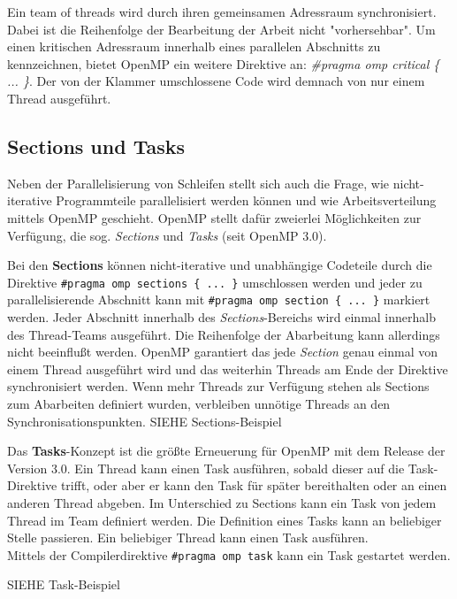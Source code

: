 \documentclass[11pt]{scrartcl}
\begin{document}
Ein team of threads wird durch ihren gemeinsamen Adressraum synchronisiert. Dabei ist die Reihenfolge der Bearbeitung der Arbeit nicht "vorhersehbar". Um einen kritischen Adressraum innerhalb eines parallelen Abschnitts zu kennzeichnen, bietet OpenMP ein weitere Direktive an: \textit{\#pragma omp critical \{ ... \}}. Der von der Klammer umschlossene Code wird demnach von nur einem Thread ausgeführt. 

\subsection{Sections und Tasks}

Neben der Parallelisierung von Schleifen stellt sich auch die Frage, wie nicht-iterative Programmteile parallelisiert werden können und  wie Arbeitsverteilung mittels OpenMP geschieht. OpenMP stellt dafür zweierlei Möglichkeiten zur Verfügung, die sog. \textit{Sections} und \textit{Tasks} (seit OpenMP 3.0).

Bei den \textbf{Sections} können nicht-iterative und unabhängige Codeteile durch die Direktive \texttt{\#pragma omp sections \{ ... \}} umschlossen werden und jeder zu parallelisierende Abschnitt kann mit \texttt{\#pragma omp section \{ ... \}} markiert werden. Jeder Abschnitt innerhalb des \textit{Sections}-Bereichs wird einmal innerhalb des Thread-Teams ausgeführt. Die Reihenfolge der Abarbeitung kann allerdings nicht beeinflußt werden. OpenMP garantiert das jede \textit{Section} genau einmal von einem Thread ausgeführt wird und das weiterhin Threads am Ende der Direktive synchronisiert werden. Wenn mehr Threads zur Verfügung stehen als Sections zum Abarbeiten definiert wurden, verbleiben unnötige Threads an den Synchronisationspunkten.
SIEHE Sections-Beispiel

Das \textbf{Tasks}-Konzept ist die größte Erneuerung für OpenMP mit dem Release der Version 3.0. Ein Thread kann einen Task ausführen, sobald dieser auf die Task-Direktive trifft, oder aber er kann den Task für später bereithalten oder an einen anderen Thread abgeben. Im Unterschied zu Sections kann ein Task von jedem Thread im Team definiert werden. Die Definition eines Tasks kann an beliebiger Stelle passieren. Ein beliebiger Thread kann einen Task ausführen. \\
Mittels der Compilerdirektive \texttt{\#pragma omp task} kann ein Task gestartet werden. 

SIEHE Task-Beispiel 
 
\end{document}
